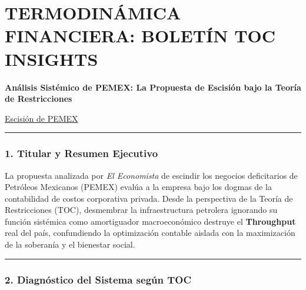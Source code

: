 \documentclass[12pt,letterpaper]{article}
\begin{document}
\hypertarget{termodinuxe1mica-financiera-boletuxedn-toc-insights}{%
\section{TERMODINÁMICA FINANCIERA: BOLETÍN TOC
INSIGHTS}\label{termodinuxe1mica-financiera-boletuxedn-toc-insights}}

\textbf{Análisis Sistémico de PEMEX: La Propuesta de Escisión bajo la
Teoría de Restricciones}

\href{https://es-us.noticias.yahoo.com/proponen-escindir-pemex-negocios-deficitarios-050356273.html}{Escisión
de PEMEX}

\begin{center}\rule{0.5\linewidth}{0.5pt}\end{center}

\hypertarget{titular-y-resumen-ejecutivo}{%
\subsubsection{1. Titular y Resumen
Ejecutivo}\label{titular-y-resumen-ejecutivo}}

La propuesta analizada por \emph{El Economista} de escindir los negocios
deficitarios de Petróleos Mexicanos (PEMEX) evalúa a la empresa bajo los
dogmas de la contabilidad de costos corporativa privada. Desde la
perspectiva de la Teoría de Restricciones (TOC), desmembrar la
infraestructura petrolera ignorando su función sistémica como
amortiguador macroeconómico destruye el \textbf{Throughput} real del
país, confundiendo la optimización contable aislada con la maximización
de la soberanía y el bienestar social.

\begin{center}\rule{0.5\linewidth}{0.5pt}\end{center}

\hypertarget{diagnuxf3stico-del-sistema-seguxfan-toc}{%
\subsubsection{2. Diagnóstico del Sistema según
TOC}\label{diagnuxf3stico-del-sistema-seguxfan-toc}}
\end{document}
